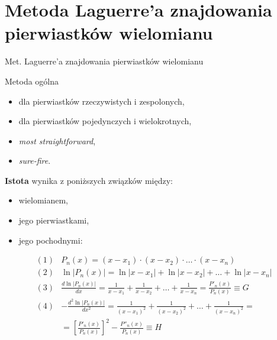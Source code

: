 \section{Metoda Laguerre'a znajdowania pierwiastków wielomianu}

\begin{frame}{Met. Laguerre'a znajdowania pierwiastków wielomianu}
  \begin{block}{Metoda ogólna}
    \begin{itemize}
      \item dla pierwiastków rzeczywistych i zespolonych,
      \item dla pierwiastków pojedynczych i wielokrotnych,
      \item \textit{most straightforward},
      \item \textit{sure-fire}.
    \end{itemize}
  \end{block}
\end{frame}

\begin{frame}
  \textbf{Istota} wynika z poniższych związków między:
  \begin{itemize}
    \item wielomianem,
    \item jego pierwiastkami,
    \item jego pochodnymi:
  \end{itemize}

  \begin{block}{}
    $$ \begin{array}{ll}
    (1) & P_n(x) = (x - x_1) \cdot (x - x_2) \cdot \ldots \cdot (x - x_n) \\
    (2) & \ln|P_n(x)| = \ln|x - x_1| + \ln|x - x_2| + \ldots + \ln|x - x_n| \\
    (3) & \frac{d \ln|P_n(x)|}{dx} = \frac{1}{x - x_1} + \frac{1}{x - x_2} + \ldots + \frac{1}{x - x_n} = \frac{P'_n(x)}{P_n(x)} \equiv G \\
    (4) & -\frac{d^2 \ln|P_n(x)|}{dx^2} = \frac{1}{(x - x_1)^2} + \frac{1}{(x - x_2)^2} + \ldots + \frac{1}{(x - x_n)^2} = \\
    & = \left[ \frac{P'_n(x)}{P_n(x)} \right] ^2 - \frac{P''_n(x)}{P_n(x)} \equiv H
    \end{array} $$
  \end{block}
\end{frame}

